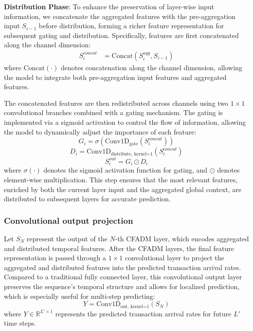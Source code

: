 \documentclass[a4paper,fleqn]{cas-dc}
\begin{document}
\textbf{Distribution Phase}:
To enhance the preservation of layer-wise input information, we concatenate the aggregated features with the pre-aggregation input $S_{i-1}$ before distribution, forming a richer feature representation for subsequent gating and distribution. Specifically, features are first concatenated along the channel dimension:
\begin{align}
	S_i^{concat} &= \text{Concat}(S_i^{agg}, S_{i-1})
\end{align}
where $\text{Concat}(\cdot)$ denotes concatenation along the channel dimension, allowing the model to integrate both pre-aggregation input features and aggregated features.

The concatenated features are then redistributed across channels using two $1\times1$ convolutional branches combined with a gating mechanism. The gating is implemented via a sigmoid activation to control the flow of information, allowing the model to dynamically adjust the importance of each feature:
\begin{equation}
	G_i = \sigma(\text{Conv1D}_{\text{gate}}(S_i^{concat}))
\end{equation}
\begin{equation}
	D_i = \text{Conv1D}_{\text{distribute, kernel=1}}(S_i^{concat})
\end{equation}
\begin{equation}
	S_i^{out} = G_i \odot D_i
\end{equation}
where $\sigma(\cdot)$ denotes the sigmoid activation function for gating, and $\odot$ denotes element-wise multiplication. This step ensures that the most relevant features, enriched by both the current layer input and the aggregated global context, are distributed to subsequent layers for accurate prediction.

\subsubsection{Convolutional output projection}
\vspace{6pt}
Let $S_N$ represent the output of the $N$-th CFADM layer, which encodes aggregated and distributed temporal features. After the CFADM layers, the final feature representation is passed through a $1\times1$ convolutional layer to project the aggregated and distributed features into the predicted transaction arrival rates. Compared to a traditional fully connected layer, this convolutional output layer preserves the sequence's temporal structure and allows for localized prediction, which is especially useful for multi-step predicting:
\begin{equation}
	Y = \text{Conv1D}_{\text{out, kernel=1}}(S_N)
\end{equation}
where $Y \in \mathbb{R}^{L' \times 1}$ represents the predicted transaction arrival rates for future $L'$ time steps.
\end{document}

